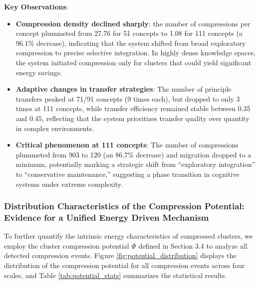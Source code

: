\documentclass[10pt,onecolumn]{article}
\begin{document}
\textbf{Key Observations}:
\begin{itemize}
    \item \textbf{Compression density declined sharply}: the number of compressions per concept plummeted from 27.76 for 51 concepts to 1.08 for 111 concepts (a 96.1\% decrease), indicating that the system shifted from broad exploratory compression to precise selective integration. In highly dense knowledge spaces, the system initiated compression only for clusters that could yield significant energy savings.
    \item \textbf{Adaptive changes in transfer strategies}: The number of principle transfers peaked at 71/91 concepts (9 times each), but dropped to only 3 times at 111 concepts, while transfer efficiency remained stable between 0.35 and 0.45, reflecting that the system prioritizes transfer quality over quantity in complex environments.
    \item \textbf{Critical phenomenon at 111 concepts}: The number of compressions plummeted from 903 to 120 (an 86.7\% decrease) and migration dropped to a minimum, potentially marking a strategic shift from “exploratory integration” to “conservative maintenance,” suggesting a phase transition in cognitive systems under extreme complexity.
\end{itemize}

\subsubsection{Distribution Characteristics of the Compression Potential: Evidence for a Unified Energy Driven Mechanism}

To further quantify the intrinsic energy characteristics of compressed clusters, we employ the cluster compression potential $\Phi$ defined in Section 3.4 to analyze all detected compression events. Figure \ref{fig:potential_distribution} displays the distribution of the compression potential for all compression events across four scales, and Table \ref{tab:potential_stats} summarizes the statistical results.
\end{document}
